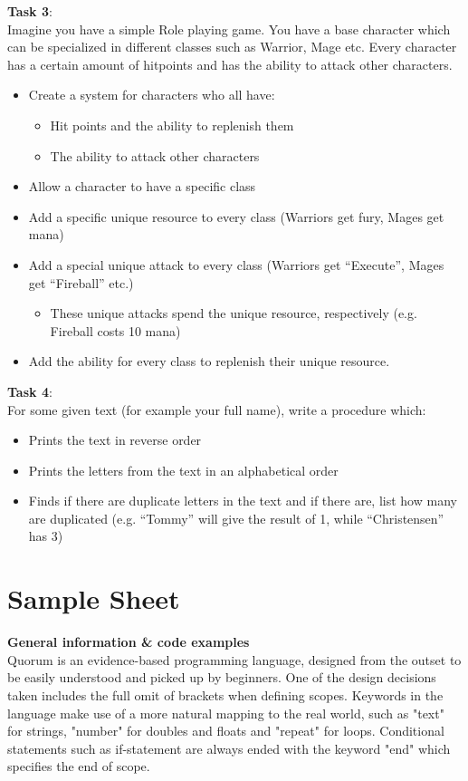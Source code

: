 \textbf{Task 3}:\\
Imagine you have a simple Role playing game. You have a base character which can be specialized in different classes such as Warrior, Mage etc. Every character has a certain amount of hitpoints and has the ability to attack other characters. 
\begin{itemize}
\item Create a system for characters who all have:
\begin{itemize}
\item Hit points and the ability to replenish them
\item The ability to attack other characters
\end{itemize}
\item Allow a character to have a specific class
\item Add a specific unique resource to every class (Warriors get fury, Mages get mana)
\item Add a special unique attack to every class (Warriors get “Execute”, Mages get “Fireball” etc.)
\begin{itemize}
\item These unique attacks spend the unique resource, respectively (e.g. Fireball costs 10 mana) 
\end{itemize}
\item Add the ability for every class to replenish their unique resource.
\end{itemize}

\textbf{Task 4}:\\
For some given text (for example your full name), write a procedure which:
\begin{itemize}
\item Prints the text in reverse order
\item Prints the letters from the text in an alphabetical order
\item Finds if there are duplicate letters in the text and if there are, list how many are duplicated (e.g. “Tommy” will give the result of 1, while “Christensen” has 3) 
\end{itemize}

\chapter{Sample Sheet}
\label{chapter:sampleSheet}
\textbf{General information \& code examples}\\
Quorum is an evidence-based programming language, designed from the outset to be easily understood and picked up by beginners. One of the design decisions taken includes the full omit of brackets when defining scopes. Keywords in the language make use of a more natural mapping to the real world, such as "text" for strings, "number" for doubles and floats  and "repeat" for loops. Conditional statements such as if-statement are always ended with the keyword "end" which specifies the end of scope.

